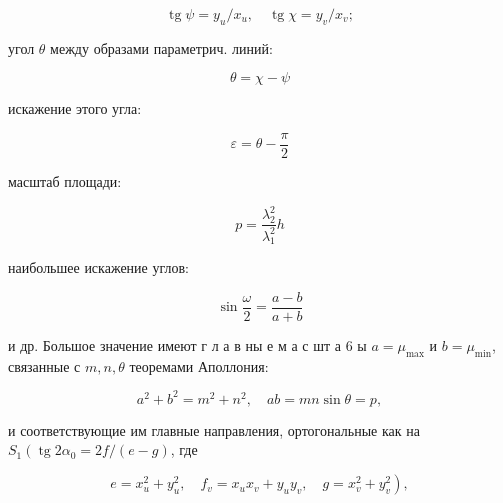 \documentclass[10pt]{article}
\begin{document}
\[

\operatorname{tg} \psi=y_{u} / x_{u}, \quad \operatorname{tg} \chi=y_{v} / x_{v} ;

\]



угол $\theta$ между образами параметрич. линий:



\[

\theta=\chi-\psi

\]



искажение этого угла:



\[

\varepsilon=\theta-\frac{\pi}{2}

\]



масштаб площади:



\[

p=\frac{\lambda_{2}^{2}}{\lambda_{1}^{2}} h

\]



наибольшее искажение углов:



\[

\sin \frac{\omega}{2}=\frac{a-b}{a+b}

\]



и др. Большое значение имеют г л а в ны е м а с шт а 6 ы $a=\mu_{\max }$ и $b=\mu_{\min }$, связанные с $m, n, \theta$ теоремами Аполлония:



\[

a^{2}+b^{2}=m^{2}+n^{2}, \quad a b=m n \sin \theta=p,

\]



и соответствующие им главные направления, ортогональные как на $S_{1}\left(\operatorname{tg} 2 \alpha_{0}=2 f /(e-g)\right.$, где



\[

\left.e=x_{u}^{2}+y_{u}^{2}, \quad f_{v}=x_{u} x_{v}+y_{u} y_{v}, \quad g=x_{v}^{2}+y_{v}^{2}\right),

\]
\end{document}

